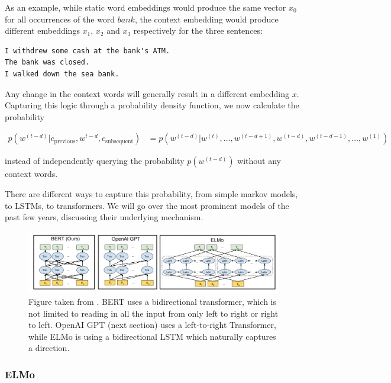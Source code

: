 \documentclass[a4paper,12pt,twoside,openright]{report}
\begin{document}
As an example, while static word embeddings would produce the same vector $x_0$ for all occurrences of the word $bank$, the context embedding would produce different embeddings $x_1$, $x_2$ and $x_3$ respectively for the three sentences:

\begin{verbatim}
I withdrew some cash at the bank's ATM.
The bank was closed.
I walked down the sea bank.
\end{verbatim}

Any change in the context words will generally result in a different embedding $x$.
Capturing this logic through a probability density function, we now calculate the probability

\begin{align}
p(w^{(t-d)} | c_\text{previous}, w^{t-d}, c_\text{subsequent}) &= p(w^{(t-d)} | w^{(t)}, \ldots, w^{(t-d + 1)}, w^{(t-d)}, w^{(t-d - 1)}, \ldots, w^{(1)})
\end{align}{\label{eq:transformer_probability}}

instead of independently querying the probability $p(w^{(t-d)})$ without any context words.

There are different ways to capture this probability, from simple markov models, to LSTMs, to transformers.
We will go over the most prominent models of the past few years, discussing their underlying mechanism.

\begin{figure}[h]
	\center
  \includegraphics[width=\linewidth]{./assets/background/BERT_GPT_ELMo.png}
  \caption{Figure taken from \cite{devlin18}. BERT uses a bidirectional transformer, which is not limited to reading in all the input from only left to right or right to left. OpenAI GPT (next section) uses a left-to-right Transformer, while ELMo is using a bidirectional LSTM which naturally captures a direction. }
  \label{fig:attention_is_all_you_need}
\end{figure}

\subsubsection{ELMo}
\end{document}
